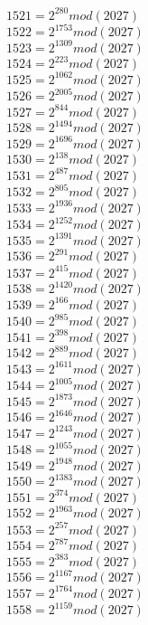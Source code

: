 \documentclass[12pt, letterpaper]{article}
\begin{document}
\begin{itemize}
\begin{multicols}{3}
$1521= 2^{280} mod (2027)$\\
$1522= 2^{1753} mod (2027)$\\
$1523= 2^{1309} mod (2027)$\\
$1524= 2^{223} mod (2027)$\\
$1525= 2^{1062} mod (2027)$\\
$1526= 2^{2005} mod (2027)$\\
$1527= 2^{844} mod (2027)$\\
$1528= 2^{1494} mod (2027)$\\
$1529= 2^{1696} mod (2027)$\\
$1530= 2^{138} mod (2027)$\\
$1531= 2^{487} mod (2027)$\\
$1532= 2^{805} mod (2027)$\\
$1533= 2^{1936} mod (2027)$\\
$1534= 2^{1252} mod (2027)$\\
$1535= 2^{1391} mod (2027)$\\
$1536= 2^{291} mod (2027)$\\
$1537= 2^{415} mod (2027)$\\
$1538= 2^{1420} mod (2027)$\\
$1539= 2^{166} mod (2027)$\\
$1540= 2^{985} mod (2027)$\\
$1541= 2^{398} mod (2027)$\\
$1542= 2^{889} mod (2027)$\\
$1543= 2^{1611} mod (2027)$\\
$1544= 2^{1005} mod (2027)$\\
$1545= 2^{1873} mod (2027)$\\
$1546= 2^{1646} mod (2027)$\\
$1547= 2^{1243} mod (2027)$\\
$1548= 2^{1055} mod (2027)$\\
$1549= 2^{1948} mod (2027)$\\
$1550= 2^{1383} mod (2027)$\\
$1551= 2^{374} mod (2027)$\\
$1552= 2^{1963} mod (2027)$\\
$1553= 2^{257} mod (2027)$\\
$1554= 2^{787} mod (2027)$\\
$1555= 2^{383} mod (2027)$\\
$1556= 2^{1167} mod (2027)$\\
$1557= 2^{1764} mod (2027)$\\
$1558= 2^{1159} mod (2027)$\\

\end{multicols}
\end{itemize}
\end{document}
